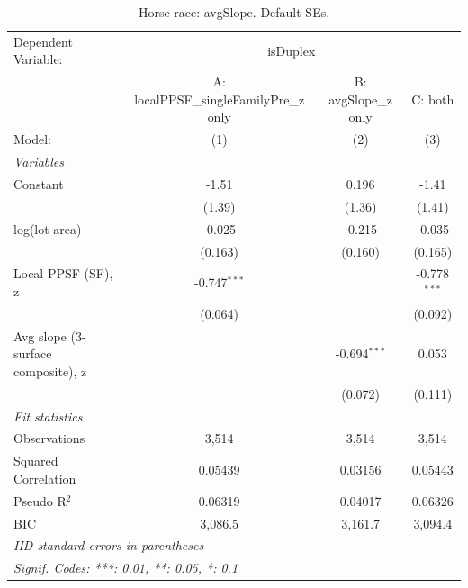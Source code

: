 
\begin{table}[htbp]
   \caption{\label{tab:horseRace_avgSlope_default} Horse race: avgSlope. Default SEs.}
   \centering
   \begin{tabular}{lccc}
      \tabularnewline \midrule \midrule
      Dependent Variable: & \multicolumn{3}{c}{isDuplex}\\
                                         & A: localPPSF\_singleFamilyPre\_z only   & B: avgSlope\_z only  & C: both \\   
      Model:                             & (1)                                     & (2)                  & (3)\\  
      \midrule
      \emph{Variables}\\
      Constant                           & -1.51                                   & 0.196                & -1.41\\   
                                         & (1.39)                                  & (1.36)               & (1.41)\\   
      log(lot area)                      & -0.025                                  & -0.215               & -0.035\\   
                                         & (0.163)                                 & (0.160)              & (0.165)\\   
      Local PPSF (SF), z                 & -0.747$^{***}$                          &                      & -0.778$^{***}$\\   
                                         & (0.064)                                 &                      & (0.092)\\   
      Avg slope (3-surface composite), z &                                         & -0.694$^{***}$       & 0.053\\   
                                         &                                         & (0.072)              & (0.111)\\   
      \midrule
      \emph{Fit statistics}\\
      Observations                       & 3,514                                   & 3,514                & 3,514\\  
      Squared Correlation                & 0.05439                                 & 0.03156              & 0.05443\\  
      Pseudo R$^2$                       & 0.06319                                 & 0.04017              & 0.06326\\  
      BIC                                & 3,086.5                                 & 3,161.7              & 3,094.4\\  
      \midrule \midrule
      \multicolumn{4}{l}{\emph{IID standard-errors in parentheses}}\\
      \multicolumn{4}{l}{\emph{Signif. Codes: ***: 0.01, **: 0.05, *: 0.1}}\\
   \end{tabular}
\end{table}


